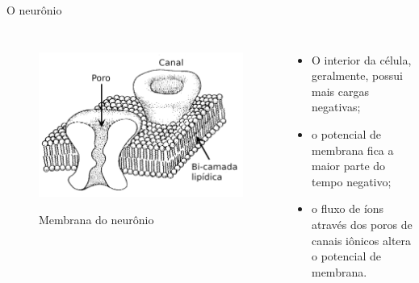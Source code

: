 \begin{frame}{O neurônio}
	\begin{columns}[t]
		\column{5cm}
			\begin{figure}[tb]
				\centering
				\caption{Membrana do neurônio}
				\includegraphics[width=\linewidth]{figs/membrana_neuronio}
				\label{fig:membrananeuronio}
			\end{figure}
		\column{5cm}
			\begin{itemize}
				\item O interior da célula, geralmente, possui mais cargas negativas;
				\item o potencial de membrana fica a maior parte do tempo negativo;
				\item o fluxo de íons através dos poros de canais iônicos altera o potencial de membrana.
			\end{itemize}
	\end{columns}
\end{frame}

